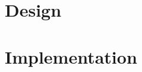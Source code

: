 
\section{Design}
\label{realisation:design}

\section{Implementation}
\label{realisation:implementation}